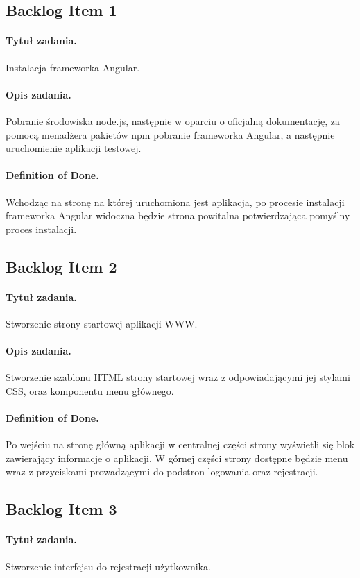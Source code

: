 \documentclass[a4paper]{article}
\begin{document}
\subsection{Backlog Item 1} 
\paragraph{Tytuł zadania.} Instalacja frameworka Angular.
\paragraph{Opis zadania.} Pobranie środowiska node.js, następnie w oparciu o oficjalną dokumentację, za pomocą menadżera pakietów npm pobranie frameworka Angular, a następnie uruchomienie aplikacji testowej. 
\paragraph{Definition of Done.} Wchodząc na stronę na której uruchomiona jest aplikacja, po procesie instalacji frameworka Angular widoczna będzie strona powitalna potwierdzająca pomyślny proces instalacji.

\subsection{Backlog Item 2}
\paragraph{Tytuł zadania.} Stworzenie strony startowej aplikacji WWW.
\paragraph{Opis zadania.} Stworzenie szablonu HTML strony startowej wraz z odpowiadającymi jej stylami CSS, oraz komponentu menu głównego.
\paragraph{Definition of Done.} Po wejściu na stronę główną aplikacji w centralnej części strony wyświetli się blok zawierający
informacje o aplikacji. W górnej części strony dostępne będzie menu wraz z przyciskami prowadzącymi do podstron logowania oraz rejestracji.

\subsection{Backlog Item 3} 
\paragraph{Tytuł zadania.} Stworzenie interfejsu do rejestracji użytkownika.
\end{document}
